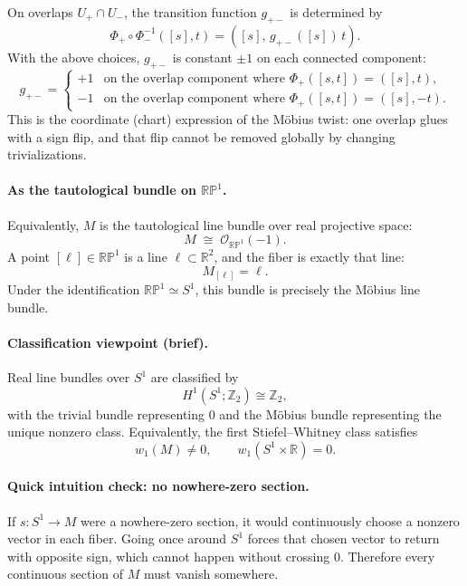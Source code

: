 \documentclass[12pt,a4paper]{article}
\theoremstyle{plain}
\theoremstyle{definition}      %
\begin{document}
	On overlaps $U_+\cap U_-$, the transition function $g_{+-}$ is determined by
	\[
	\Phi_+\circ \Phi_-^{-1}([s],t)=([s],\,g_{+-}([s])\,t).
	\]
	With the above choices, $g_{+-}$ is constant $\pm 1$ on each connected component:
	\[
	g_{+-}=
	\begin{cases}
		+1 & \text{on the overlap component where } \Phi_+([s,t])=([s],t),\\
		-1 & \text{on the overlap component where } \Phi_+([s,t])=([s],-t).
	\end{cases}
	\]
	This is the coordinate (chart) expression of the Möbius twist: one overlap glues with
	a sign flip, and that flip cannot be removed globally by changing trivializations.
	
	\paragraph{As the tautological bundle on $\mathbb{RP}^1$.}
	Equivalently, $M$ is the tautological line bundle over real projective space:
	\[
	M \;\cong\; \mathcal{O}_{\mathbb{RP}^1}(-1).
	\]
	A point $[\ell]\in \mathbb{RP}^1$ is a line $\ell\subset\mathbb{R}^2$, and the fiber is
	exactly that line:
	\[
	M_{[\ell]}=\ell.
	\]
	Under the identification $\mathbb{RP}^1\simeq S^1$, this bundle is precisely the Möbius
	line bundle.
	
	\paragraph{Classification viewpoint (brief).}
	Real line bundles over $S^1$ are classified by
	\[
	H^1(S^1;\mathbb{Z}_2)\cong \mathbb{Z}_2,
	\]
	with the trivial bundle representing $0$ and the Möbius bundle representing the unique
	nonzero class. Equivalently, the first Stiefel--Whitney class satisfies
	\[
	w_1(M)\neq 0,\qquad w_1(S^1\times\mathbb{R})=0.
	\]
	
	\paragraph{Quick intuition check: no nowhere-zero section.}
	If $s:S^1\to M$ were a nowhere-zero section, it would continuously choose a nonzero vector
	in each fiber. Going once around $S^1$ forces that chosen vector to return with opposite
	sign, which cannot happen without crossing $0$. Therefore every continuous section of $M$
	must vanish somewhere.
	
	
\end{document}
